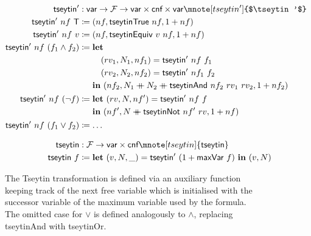 \begin{figure}
\begin{align*}
  \tseytin' &: \var \rightarrow \formula \rightarrow \var \times \cnf \times \var \mnote[tseytin']{$\tseytin'$}\\
  \tseytin'~nf~\btrue &\defeq (nf, \textsf{tseytinTrue}~nf, \natS{nf}) \\
  \tseytin'~nf~v &\defeq (nf, \textsf{tseytinEquiv}~v~nf, \natS{nf}) \\
  \tseytin'~nf~(f_1 \land f_2) &\defeq \begin{aligned}[t] 
    &\llet \\
    & \quad (rv_1, N_1, nf_1) = \tseytin'~nf~f_1 \\
    & \quad (rv_2, N_2, nf_2) = \tseytin'~nf_1~f_2 \\
    & \lin (nf_2, N_1 \concat N_2 \concat \textsf{tseytinAnd}~nf_2~rv_1~rv_2, \natS{nf_2})
  \end{aligned}\\
    \tseytin'~nf~(\lnot f) &\defeq \begin{aligned}[t]
      &\llet (rv, N, nf') = \tseytin'~nf~f \\
      &\lin (nf', N \concat \textsf{tseytinNot}~nf'~rv, \natS{nf})
    \end{aligned} \\
  \tseytin'~nf~(f_1 \lor f_2) &\defeq \ldots \\[0.8em]
  \tseytin & : \formula \rightarrow \var \times \cnf \mnote[tseytin]{\tseytin}\\
  \tseytin~f &\defeq \llet (v, N, \_) = \tseytin'~(\natS{\textsf{maxVar}~f})~\lin (v, N) 
\end{align*}
\caption{The Tseytin transformation is defined via an auxiliary function keeping track of the next free variable which is initialised with the successor variable of the maximum variable used by the formula. The omitted case for $\lor$ is defined analogously to $\land$, replacing \textsf{tseytinAnd} with \textsf{tseytinOr}.}\label{lst:tseytin}
\end{figure}

